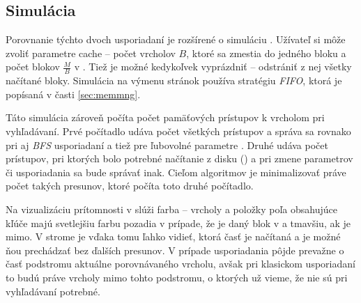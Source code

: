 \subsection{Simulácia \cache}
Porovnanie týchto dvoch usporiadaní je rozšírené o simuláciu \cache. Užívateľ si môže zvoliť parametre cache -- počet vrcholov $B$, ktoré sa zmestia do jedného bloku a počet blokov $\frac{M}{B}$ v \cache. Tiež je možné \cache kedykoľvek vyprázdniť -- odstrániť z nej všetky načítané bloky. Simulácia na výmenu stránok používa stratégiu \emph{FIFO}, ktorá je popísaná v časti \ref{sec:memmng}.

Táto simulácia zároveň počíta počet pamäťových prístupov k vrcholom pri vyhľadávaní. Prvé počítadlo udáva počet všetkých prístupov a správa sa rovnako pri  aj \emph{BFS} usporiadaní a tiež pre ľubovolné parametre \cache. Druhé udáva počet prístupov, pri ktorých bolo potrebné načítanie z disku (\miss) a pri zmene parametrov či usporiadania sa bude správať inak. Cieľom \obliv algoritmov je minimalizovať práve počet takých presunov, ktoré počíta toto druhé počítadlo.



Na vizualizáciu prítomnosti v \cache slúži farba -- vrcholy a položky poľa obsahujúce kľúče majú svetlejšiu farbu pozadia v prípade, že je daný blok v \cache a tmavšiu, ak je mimo. V strome je vďaka tomu ľahko vidieť, ktorá časť je načítaná a je možné ňou prechádzať bez ďalších presunov. V prípade  usporiadania pôjde prevažne o časť podstromu aktuálne porovnávaného vrcholu, avšak pri klasickom usporiadaní to budú práve vrcholy mimo tohto podstromu, o ktorých už vieme, že nie sú pri vyhľadávaní potrebné.

